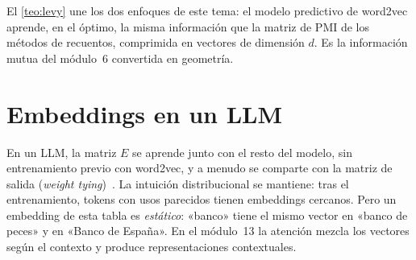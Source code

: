 \begin{observacion}
El \cref{teo:levy} une los dos enfoques de este tema: el modelo predictivo de word2vec aprende, en el óptimo, la misma información que la matriz de PMI de los métodos de recuentos, comprimida en vectores de dimensión $d$. Es la información mutua del módulo~6 convertida en geometría.
\end{observacion}

\section{Embeddings en un LLM}

En un LLM, la matriz $E$ se aprende junto con el resto del modelo, sin entrenamiento previo con word2vec, y a menudo se comparte con la matriz de salida (\emph{weight tying})~\cite[§14.2.3]{jm3}. La intuición distribucional se mantiene: tras el entrenamiento, tokens con usos parecidos tienen embeddings cercanos. Pero un embedding de esta tabla es \emph{estático}: «banco» tiene el mismo vector en «banco de peces» y en «Banco de España». En el módulo~13 la atención mezcla los vectores según el contexto y produce representaciones contextuales.

\addtocounter{figure}{1}%

